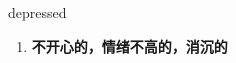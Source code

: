 
\begin{frame}
{\huge depressed}
\begin{center}
\begin{enumerate}\Large
  \item \textbf{不开心的，情绪不高的，消沉的}
\end{enumerate}
\end{center}
\end{frame}

